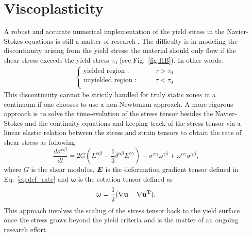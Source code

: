 \section{Viscoplasticity}
A robust and accurate numerical implementation of the yield stress in the Navier-Stokes equations is still a matter of research \cite{ragui2018progress}. The difficulty is in modeling the discontinuity arising from the yield stress; the material should only flow if the shear stress exceeds the yield stress $\tau_0$ (see Fig.~\ref{fig:HB}). In other words:
\begin{align}
\begin{cases}
\text{yielded region :}\qquad & \tau>\tau_0\\
\text{unyielded region :}\qquad& \tau<\tau_0\\
\end{cases}.
\end{align}
This discontinuity cannot be strictly handled for truly static zones in a continuum if one chooses to use a non-Newtonian approach. A more rigorous approach is to solve the time-evolution of the stress tensor besides the Navier-Stokes and the continuity equations and keeping track of the stress tensor via a linear elastic relation between the stress and strain tensors \cite{gray2001sph,Monaghan2000} to obtain the rate of shear stress as following
\begin{equation}\label{eq:shear_stress_rate}
\frac{d\sigma^{\alpha\beta}}{dt} = 2G(E^{\alpha\beta}-\frac{1}{3}\delta^{\alpha\beta}{E}^{\gamma\gamma})-\sigma^{\alpha\gamma}\omega^{\gamma\beta} + \omega^{\alpha\gamma}\sigma^{\gamma\beta},
\end{equation}
where $G$ is the shear modulus, $\boldsymbol{E}$ is the deformation gradient tensor defined in Eq.~\ref{eq:def_rate} and $\bm \omega$ is the rotation tensor defined as
\begin{align}
\bm \omega=\frac{1}{2}(\nabla\bf{u}-\nabla\bf{u}^T).
\label{eq:rot_rate}
\end{align}
This approach involves the scaling of the stress tensor back to the yield surface once the stress grows beyond the yield criteria and is the matter of an ongoing research effort. 

